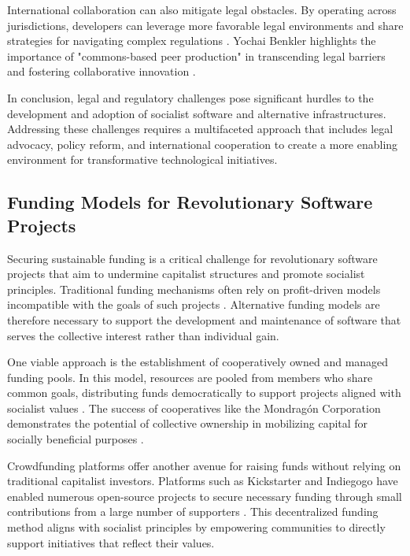 \begin{refsection}
International collaboration can also mitigate legal obstacles. By operating across jurisdictions, developers can leverage more favorable legal environments and share strategies for navigating complex regulations \cite[pp.~60]{Benkler2006}. Yochai Benkler highlights the importance of "commons-based peer production" in transcending legal barriers and fostering collaborative innovation \cite[pp.~60]{Benkler2006}.

In conclusion, legal and regulatory challenges pose significant hurdles to the development and adoption of socialist software and alternative infrastructures. Addressing these challenges requires a multifaceted approach that includes legal advocacy, policy reform, and international cooperation to create a more enabling environment for transformative technological initiatives.

\subsection{Funding Models for Revolutionary Software Projects}

Securing sustainable funding is a critical challenge for revolutionary software projects that aim to undermine capitalist structures and promote socialist principles. Traditional funding mechanisms often rely on profit-driven models incompatible with the goals of such projects \cite[pp.~136-138]{Restakis2010}. Alternative funding models are therefore necessary to support the development and maintenance of software that serves the collective interest rather than individual gain.

One viable approach is the establishment of cooperatively owned and managed funding pools. In this model, resources are pooled from members who share common goals, distributing funds democratically to support projects aligned with socialist values \cite[pp.~85-88]{Wright2010}. The success of cooperatives like the Mondragón Corporation demonstrates the potential of collective ownership in mobilizing capital for socially beneficial purposes \cite[pp.~45-47]{Whyte1991}.

Crowdfunding platforms offer another avenue for raising funds without relying on traditional capitalist investors. Platforms such as Kickstarter and Indiegogo have enabled numerous open-source projects to secure necessary funding through small contributions from a large number of supporters \cite[pp.~443-445]{Ordanini2011}. This decentralized funding method aligns with socialist principles by empowering communities to directly support initiatives that reflect their values.


\end{refsection}
